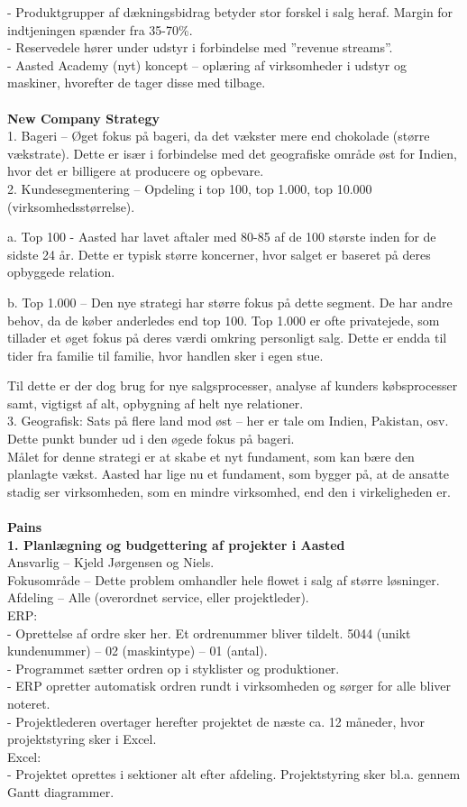 - Produktgrupper af dækningsbidrag betyder stor forskel i salg heraf. Margin for indtjeningen spænder fra 35-70\%.\\
- Reservedele hører under udstyr i forbindelse med ”revenue streams”.\\
- Aasted Academy (nyt) koncept – oplæring af virksomheder i udstyr og maskiner, hvorefter de tager disse med tilbage.\\\\
\textbf{New Company Strategy}\\
1. Bageri – Øget fokus på bageri, da det vækster mere end chokolade (større vækstrate). Dette er især i forbindelse med det geografiske område øst for Indien, hvor det er billigere at producere og opbevare.\\
2. Kundesegmentering – Opdeling i top 100, top 1.000, top 10.000 (virksomhedsstørrelse).

a. Top 100 - Aasted har lavet aftaler med 80-85 af de 100 største inden for de sidste 24 år. Dette er typisk større koncerner, hvor salget er baseret på deres opbyggede relation.

b. Top 1.000 – Den nye strategi har større fokus på dette segment. De har andre behov, da de køber anderledes end top 100. Top 1.000 er ofte privatejede, som tillader et øget fokus på deres værdi omkring personligt salg. Dette er endda til tider fra familie til familie, hvor handlen sker i egen stue.

Til dette er der dog brug for nye salgsprocesser, analyse af kunders købsprocesser samt, vigtigst af alt, opbygning af helt nye relationer.\\
3. Geografisk: Sats på flere land mod øst – her er tale om Indien, Pakistan, osv. Dette punkt bunder ud i den øgede fokus på bageri.\\
Målet for denne strategi er at skabe et nyt fundament, som kan bære den planlagte vækst. Aasted har lige nu et fundament, som bygger på, at de ansatte stadig ser virksomheden, som en mindre virksomhed, end den i virkeligheden er.\\\\
\textbf{Pains}\\
\textbf{1. Planlægning og budgettering af projekter i Aasted}\\
Ansvarlig – Kjeld Jørgensen og Niels.\\
Fokusområde – Dette problem omhandler hele flowet i salg af større løsninger.\\
Afdeling – Alle (overordnet service, eller projektleder).\\
ERP:\\
- Oprettelse af ordre sker her. Et ordrenummer bliver tildelt. 5044 (unikt kundenummer) – 02 (maskintype) – 01 (antal).\\
- Programmet sætter ordren op i styklister og produktioner.\\
- ERP opretter automatisk ordren rundt i virksomheden og sørger for alle bliver noteret.\\
- Projektlederen overtager herefter projektet de næste ca. 12 måneder, hvor projektstyring sker i Excel.\\
Excel:\\
- Projektet oprettes i sektioner alt efter afdeling. Projektstyring sker bl.a. gennem Gantt diagrammer.

